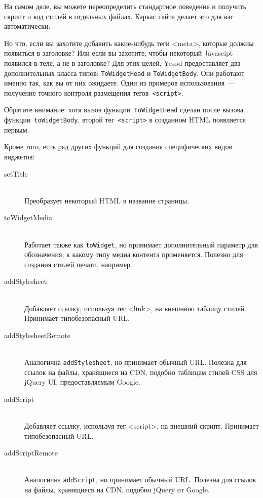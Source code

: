\begin{remark}
    На самом деле, вы можете переопределить стандартное поведение и получить
    скрипт и код стилей в отдельных файлах. Каркас сайта делает это для вас
    автоматически.
\end{remark}

Но что, если вы захотите добавить какие-нибудь теги <meta>, которые должны
появиться в заголовке? Или если вы захотите, чтобы некоторый Javascipt появился
в теле, а не в заголовке? Для этих целей, Yesod предоставляет два
дополнительных класса типов: \lstinline'ToWidgetHead' и
\lstinline'ToWidgetBody'. Они работают именно так, как вы от них ожидаете. Один
из примеров использования~--- получение точного контроля размещения
тегов~\texttt{<script>}.


Обратите внимание: хотя вызов функции~\lstinline'ToWidgetHead' сделан после
вызова функции~\lstinline'toWidgetBody', второй тег~\texttt{<script>} в
созданном HTML появляется первым.

Кроме того, есть ряд других функций для создания специфических видов виджетов:
\begin{description}
    \item[setTitle] \hfill \\
        Преобразует некоторый HTML в название страницы.

    \item[toWidgetMedia] \hfill \\
        Работает также как \lstinline'toWidget', но принимает дополнительный
        параметр для обозначения, к какому типу медиа контента применяется.
        Полезно для создания стилей печати, например.

    \item[addStylesheet] \hfill \\
        Добавляет ссылку, используя тег <link>, на внешнюю таблицу стилей.
        Принимает типобезопасный URL.

    \item[addStylesheetRemote] \hfill \\
        Аналогична \lstinline'addStylesheet', но принимает обычный URL. Полезна
        для ссылок на файлы, хранящиеся на CDN, подобно таблицам стилей CSS для
        jQuery UI, предоставляемым Google.

    \item[addScript] \hfill \\
        Добавляет ссылку, используя тег <script>, на внешний скрипт. Принимает
        типобезопасный URL.

    \item[addScriptRemote] \hfill \\
        Аналогична \lstinline'addScript', но принимает обычный URL. Полезна для
        ссылок на файлы, хранящиеся на CDN, подобно jQuery от Google.
\end{description}

